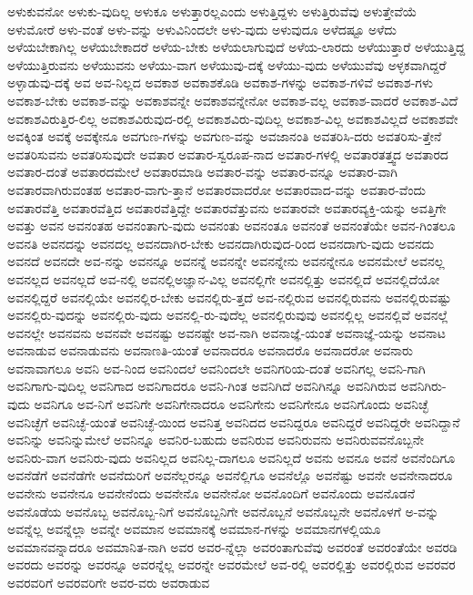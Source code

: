 {ಅಳುಕುವನೋ
ಅಳುಕು-ವುದಿಲ್ಲ
ಅಳುಕೂ
ಅಳುತ್ತಾರಲ್ಲಎಂದು
ಅಳುತ್ತಿದ್ದಳು
ಅಳುತ್ತಿರುವೆವು
ಅಳುತ್ತೇವೆಯೆ
ಅಳುಮೋರೆ
ಅಳು-ವಂತೆ
ಅಳು-ವನ್ನು
ಅಳುವಿನಿಂದಲೇ
ಅಳು-ವುದು
ಅಳುವುದೂ
ಅಳೆದಷ್ಟೂ
ಅಳೆದು
ಅಳೆಯಬೇಕಾಗಿಲ್ಲ
ಅಳೆಯಬೇಕಾದರೆ
ಅಳೆಯ-ಬೇಕು
ಅಳೆಯಲಾಗುವುದೆ
ಅಳೆಯ-ಲಾರದು
ಅಳೆಯುತ್ತಾರೆ
ಅಳೆಯುತ್ತಿದ್ದ
ಅಳೆಯುತ್ತಿರುವನು
ಅಳೆಯುವನು
ಅಳೆಯು-ವಾಗ
ಅಳೆಯುವು-ದಕ್ಕೆ
ಅಳೆಯು-ವುದು
ಅಳೆಯುವೆವು
ಅಳ್ಳಕವಾಗಿದ್ದರೆ
ಅಳ್ಳಾಡುವು-ದಕ್ಕೆ
ಅವ
ಅವ-ನಿಲ್ಲದ
ಅವಕಾಶ
ಅವಕಾಶಕೊಡಿ
ಅವಕಾಶ-ಗಳನ್ನು
ಅವಕಾಶ-ಗಳಿವೆ
ಅವಕಾಶ-ಗಳು
ಅವಕಾಶ-ಬೇಕು
ಅವಕಾಶ-ವನ್ನು
ಅವಕಾಶವನ್ನೇ
ಅವಕಾಶವನ್ನೇನೋ
ಅವಕಾಶ-ವಲ್ಲ
ಅವಕಾಶ-ವಾದರೆ
ಅವಕಾಶ-ವಿದೆ
ಅವಕಾಶವಿರುತ್ತಿರ-ಲಿಲ್ಲ
ಅವಕಾಶವಿರುವುದ-ರಲ್ಲಿ
ಅವಕಾಶವಿರು-ವುದಿಲ್ಲ
ಅವಕಾಶ-ವಿಲ್ಲ
ಅವಕಾಶವಿಲ್ಲದೆ
ಅವಕಾಶವೇ
ಅವಕ್ಕಿಂತ
ಅವಕ್ಕೆ
ಅವಕ್ಕೇನೂ
ಅವಗುಣ-ಗಳನ್ನು
ಅವಗುಣ-ವನ್ನು
ಅವಜಾನಂತಿ
ಅವತರಿಸಿ-ದರು
ಅವತರಿಸು-ತ್ತೇನೆ
ಅವತರಿಸುವನು
ಅವತರಿಸುವುದೇ
ಅವತಾರ
ಅವತಾರ-ಸ್ವರೂಪ-ನಾದ
ಅವತಾರ-ಗಳಲ್ಲಿ
ಅವತಾರತತ್ತ್ವದ
ಅವತಾರದ
ಅವತಾರ-ದಂತೆ
ಅವತಾರದಮೇಲೆ
ಅವತಾರಮಾಡಿ
ಅವತಾರ-ವನ್ನು
ಅವತಾರ-ವನ್ನೂ
ಅವತಾರ-ವಾಗಿ
ಅವತಾರವಾಗಿರುವಂತಹ
ಅವತಾರ-ವಾಗು-ತ್ತಾನೆ
ಅವತಾರವಾದರೋ
ಅವತಾರವಾದ-ವನ್ನು
ಅವತಾರ-ವೆಂದು
ಅವತಾರವೆತ್ತಿ
ಅವತಾರವೆತ್ತಿದ
ಅವತಾರವೆತ್ತಿದ್ದೇ
ಅವತಾರವೆತ್ತುವನು
ಅವತಾರವೇ
ಅವತಾರವ್ಯಕ್ತಿ-ಯನ್ನು
ಅವತ್ತಿಗೇ
ಅವತ್ತು
ಅವನ
ಅವನಂತಹ
ಅವನಂತಾಗು-ವುದು
ಅವನಂತು
ಅವನಂತೂ
ಅವನಂತೆ
ಅವನಂತೆಯೇ
ಅವನ-ಗಿಂತಲೂ
ಅವನತಿ
ಅವನದನ್ನು
ಅವನದಲ್ಲ
ಅವನದಾಗಿರ-ಬೇಕು
ಅವನದಾಗಿರುವುದ-ರಿಂದ
ಅವನದಾಗು-ವುದು
ಅವನದು
ಅವನದೆ
ಅವನದೇ
ಅವ-ನನ್ನು
ಅವನನ್ನೂ
ಅವನನ್ನೆ
ಅವನನ್ನೇ
ಅವನನ್ನೇನು
ಅವನನ್ನೇನೂ
ಅವನಮೇಲೆ
ಅವನಲ್ಲ
ಅವನಲ್ಲದ
ಅವನಲ್ಲದೆ
ಅವ-ನಲ್ಲಿ
ಅವನಲ್ಲಿಅಜ್ಞಾನ-ವಿಲ್ಲ
ಅವನಲ್ಲಿಗೇ
ಅವನಲ್ಲಿತ್ತು
ಅವನಲ್ಲಿದೆ
ಅವನಲ್ಲಿದೆಯೋ
ಅವನಲ್ಲಿದ್ದರೆ
ಅವನಲ್ಲಿಯೇ
ಅವನಲ್ಲಿರ-ಬೇಕು
ಅವನಲ್ಲಿರು-ತ್ತದೆ
ಅವ-ನಲ್ಲಿರುವ
ಅವನಲ್ಲಿರುವನು
ಅವನಲ್ಲಿರುವಷ್ಟು
ಅವನಲ್ಲಿರು-ವುದನ್ನು
ಅವನಲ್ಲಿರು-ವುದು
ಅವನಲ್ಲಿ-ರು-ವುದೆಲ್ಲ
ಅವನಲ್ಲಿರುವುವು
ಅವನಲ್ಲಿಲ್ಲ
ಅವನಲ್ಲಿವೆ
ಅವನಲ್ಲೆ
ಅವನಲ್ಲೇ
ಅವನವನು
ಅವನವೇ
ಅವನಷ್ಟು
ಅವನಷ್ಟೇ
ಅವ-ನಾಗಿ
ಅವನಾಜ್ಞೆ-ಯಂತೆ
ಅವನಾಜ್ಞೆ-ಯನ್ನು
ಅವನಾಟ
ಅವನಾಡುವ
ಅವನಾಡುವನು
ಅವನಾಣತಿ-ಯಂತೆ
ಅವನಾದರೂ
ಅವನಾದರೊ
ಅವನಾದರೋ
ಅವನಾರು
ಅವನಾವಾಗಲೂ
ಅವನಿ
ಅವ-ನಿಂದ
ಅವನಿಂದಲೆ
ಅವನಿಂದಲೇ
ಅವನಿಗರಿಯ-ದಂತೆ
ಅವನಿಗಲ್ಲ
ಅವನಿ-ಗಾಗಿ
ಅವನಿಗಾಗು-ವುದಿಲ್ಲ
ಅವನಿಗಾದ
ಅವನಿಗಾದರೂ
ಅವನಿ-ಗಿಂತ
ಅವನಿಗಿದೆ
ಅವನಿಗಿನ್ನೂ
ಅವನಿಗಿರುವ
ಅವನಿಗಿರು-ವುದು
ಅವನಿಗೂ
ಅವ-ನಿಗೆ
ಅವನಿಗೇ
ಅವನಿಗೇನಾದರೂ
ಅವನಿಗೇನು
ಅವನಿಗೇನೂ
ಅವನಿಗೊಂದು
ಅವನಿಚ್ಛೆ
ಅವನಿಚ್ಛೆಗೆ
ಅವನಿಚ್ಛೆ-ಯಂತೆ
ಅವನಿಚ್ಛೆ-ಯಿಂದ
ಅವನಿತ್ತ
ಅವನಿದದ
ಅವನಿದ್ದರೂ
ಅವನಿದ್ದರೆ
ಅವನಿದ್ದರೇ
ಅವನಿದ್ದಾನೆ
ಅವನಿನ್ನು
ಅವನಿನ್ನುಮೇಲೆ
ಅವನಿನ್ನೂ
ಅವನಿರ-ಬಹುದು
ಅವನಿರುವ
ಅವನಿರುವನು
ಅವನಿರುವವನೊಬ್ಬನೇ
ಅವನಿರು-ವಾಗ
ಅವನಿರು-ವುದು
ಅವನಿಲ್ಲದ
ಅವನಿಲ್ಲ-ದಾಗಲೂ
ಅವನಿಲ್ಲದೆ
ಅವನು
ಅವನೂ
ಅವನೆ
ಅವನೆಂದಿಗೂ
ಅವನೆಡೆಗೆ
ಅವನೆಡೆಗೇ
ಅವನೆದುರಿಗೆ
ಅವನೆಲ್ಲರನ್ನೂ
ಅವನೆಲ್ಲಿಗೂ
ಅವನೆಲ್ಲೊ
ಅವನೆಷ್ಟು
ಅವನೇ
ಅವನೇನಾದರೂ
ಅವನೇನು
ಅವನೇನೂ
ಅವನೇನೆಂದು
ಅವನೇನೊ
ಅವನೇನೋ
ಅವನೊಂದಿಗೆ
ಅವನೊಂದು
ಅವನೊಡನೆ
ಅವನೊಡೆಯ
ಅವನೊಬ್ಬ
ಅವನೊಬ್ಬ-ನಿಗೆ
ಅವನೊಬ್ಬನಿಗೇ
ಅವನೊಬ್ಬನೆ
ಅವನೊಬ್ಬನೇ
ಅವನೊಳಗೆ
ಅ-ವನ್ನು
ಅವನ್ನೆಲ್ಲ
ಅವನ್ನೆಲ್ಲಾ
ಅವನ್ನೇ
ಅವಮಾನ
ಅವಮಾನಕ್ಕೆ
ಅವಮಾನ-ಗಳನ್ನು
ಅವಮಾನಗಳಲ್ಲಿಯೂ
ಅವಮಾನವನ್ನಾದರೂ
ಅವಮಾನಿತ-ನಾಗಿ
ಅವರ
ಅವರ-ನ್ನೆಲ್ಲಾ
ಅವರಂತಾಗುವೆವು
ಅವರಂತೆ
ಅವರಂತೆಯೇ
ಅವರಡಿ
ಅವರದು
ಅವರನ್ನು
ಅವರನ್ನೂ
ಅವರನ್ನೆಲ್ಲ
ಅವರನ್ನೇ
ಅವರಮೇಲೆ
ಅವ-ರಲ್ಲಿ
ಅವರಲ್ಲಿತ್ತು
ಅವರಲ್ಲಿರುವ
ಅವರವರ
ಅವರವರಿಗೆ
ಅವರವರಿಗೇ
ಅವರ-ವರು
ಅವರಾಡುವ
}

